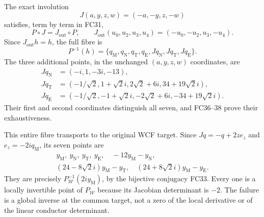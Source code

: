The exact involution
\[
 J(a,y,z,w)=(-a,-y,z,-w)
\]
satisfies, term by term in FC31,
\[
 P\circ J=J_{\mathrm{out}}\circ P,\qquad
 J_{\mathrm{out}}(u_0,u_2,u_3,u_4)=(-u_0,-u_2,u_3,-u_4).
 \tag{FC39}
\]
Since $J_{\mathrm{out}}h=h$, the full fibre is
\[
 P^{-1}(h)=\{q_{\mathrm M},q_{\mathrm N},q_{\mathrm T},q_{\mathrm E},
              Jq_{\mathrm N},Jq_{\mathrm T},Jq_{\mathrm E}\}.
 \tag{FC40}
\]
The three additional points, in the unchanged $(a,y,z,w)$ coordinates,
are
\[
\begin{aligned}
 Jq_{\mathrm N}&=(-i,1,-3i,-13),\\
 Jq_{\mathrm T}&=(-1/\sqrt2,1+\sqrt2i,2\sqrt2+6i,34+19\sqrt2i),\\
 Jq_{\mathrm E}&=(-1/\sqrt2,-1+\sqrt2i,-2\sqrt2+6i,-34+19\sqrt2i).
\end{aligned}\tag{FC41}
\]
Their first and second coordinates distinguish all seven, and FC36--38
prove their exhaustiveness.

This entire fibre transports to the original WCF target. Since
$Jq=-q+2z e_z$ and $e_z=-2i q_{\mathrm M}$, its seven points are
\[
\begin{gathered}
 y_{\mathrm M},\ y_{\mathrm N},\ y_{\mathrm T},\ y_{\mathrm E},\quad
 -12y_{\mathrm M}-y_{\mathrm N},\\
 (24-8\sqrt2i)y_{\mathrm M}-y_{\mathrm T},\quad
 (24+8\sqrt2i)y_{\mathrm M}-y_{\mathrm E}.
\end{gathered}\tag{FC42}
\]
They are precisely $P_{\mathcal W}^{-1}(2iy_{\mathrm M})$, by the
bijective conjugacy FC33. Every one is a locally invertible point of
$P_{\mathcal W}$ because its Jacobian determinant is $-2$.
The failure is a global inverse at the common target, not a zero of
the local derivative or of the linear conductor determinant.

